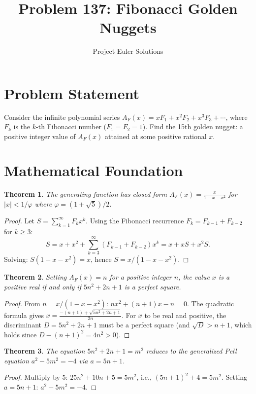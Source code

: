 \documentclass[12pt]{article}
\title{Problem 137: Fibonacci Golden Nuggets}
\author{Project Euler Solutions}
\date{}
\newtheorem{theorem}{Theorem}
\begin{document}
\maketitle

\section{Problem Statement}
Consider the infinite polynomial series $A_F(x) = xF_1 + x^2F_2 + x^3F_3 + \cdots$, where $F_k$ is the $k$-th Fibonacci number ($F_1 = F_2 = 1$). Find the 15th golden nugget: a positive integer value of $A_F(x)$ attained at some positive rational $x$.

\section{Mathematical Foundation}

\begin{theorem}
The generating function has closed form $A_F(x) = \frac{x}{1 - x - x^2}$ for $|x| < 1/\varphi$ where $\varphi = (1+\sqrt{5})/2$.
\end{theorem}

\begin{proof}
Let $S = \sum_{k=1}^\infty F_k x^k$. Using the Fibonacci recurrence $F_k = F_{k-1} + F_{k-2}$ for $k \geq 3$:
\[
S = x + x^2 + \sum_{k=3}^\infty (F_{k-1} + F_{k-2}) x^k = x + xS + x^2 S.
\]
Solving: $S(1 - x - x^2) = x$, hence $S = x/(1 - x - x^2)$.
\end{proof}

\begin{theorem}
Setting $A_F(x) = n$ for a positive integer $n$, the value $x$ is a positive real if and only if $5n^2 + 2n + 1$ is a perfect square.
\end{theorem}

\begin{proof}
From $n = x/(1 - x - x^2)$: $nx^2 + (n+1)x - n = 0$. The quadratic formula gives $x = \frac{-(n+1) + \sqrt{5n^2 + 2n + 1}}{2n}$. For $x$ to be real and positive, the discriminant $D = 5n^2 + 2n + 1$ must be a perfect square (and $\sqrt{D} > n + 1$, which holds since $D - (n+1)^2 = 4n^2 > 0$).
\end{proof}

\begin{theorem}
The equation $5n^2 + 2n + 1 = m^2$ reduces to the generalized Pell equation $a^2 - 5m^2 = -4$ via $a = 5n + 1$.
\end{theorem}

\begin{proof}
Multiply by 5: $25n^2 + 10n + 5 = 5m^2$, i.e., $(5n+1)^2 + 4 = 5m^2$. Setting $a = 5n + 1$: $a^2 - 5m^2 = -4$.
\end{proof}
\end{document}

